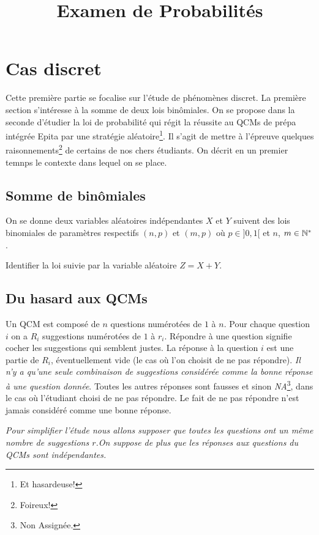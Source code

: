\documentclass[11pt, a4paper]{article}
\title{%
  { \huge Examen de Probabilités}%
}
\author{}
\date{}
\begin{document}
\maketitle\thispagestyle{fancy}

\section{Cas discret}

Cette première partie se focalise sur l'étude de phénomènes discret.
La première section s'intéresse à la somme de deux lois binômiales. On
se propose dans la seconde d'étudier la loi de probabilité qui régit
la réussite au QCMs de prépa intégrée Epita par une stratégie
aléatoire\footnote{Et hasardeuse!}. Il s'agit de mettre à l'épreuve
quelques raisonnements\footnote{Foireux!} de certains de nos chers
étudiants. On décrit en un premier temnps le contexte dans lequel on
se place.

\subsection{Somme de binômiales}

On se donne deux variables aléatoires indépendantes $X$ et $Y$ suivent
des lois binomiales de paramètres respectifs $(n, p)$ et $(m, p)$ où
$p \in ]0,1[$ et $n$, $m \in \mathbb{N}^*$.

\begin{question}{3}
  Identifier la loi suivie par la variable aléatoire $Z = X + Y$.
\end{question}

\subsection{Du hasard aux QCMs}

Un QCM est composé de $n$ questions numérotées de $1$ à $n$. Pour
chaque question $i$ on a $R_i$ suggestions numérotées de $1$ à
$r_i$. Répondre à une question signifie cocher les suggestions qui
semblent justes. La réponse à la question $i$ est une partie de $R_i$,
éventuellement vide (le cas où l'on choisit de ne pas
répondre). \emph{Il n'y a qu'une seule combinaison de suggestions
  considérée comme la bonne réponse à une question donnée}. Toutes les
autres réponses sont fausses et sinon \emph{NA}\footnote{Non
  Assignée.}, dans le cas où l'étudiant choisi de ne pas répondre. Le
fait de ne pas répondre n'est jamais considéré comme une bonne
réponse.

\begin{flushleft}
  \textit{Pour simplifier l'étude nous allons supposer que toutes les
    questions ont un même nombre de suggestions $r$.}\emph{On
    suppose de plus que les réponses aux questions du QCMs sont
    indépendantes.}
\end{flushleft}
\end{document}
